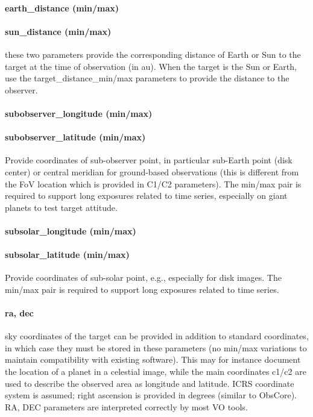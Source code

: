 \documentclass[11pt,a4paper]{ivoa}
\begin{document}
\paragraph{earth\_distance (min/max)}

\paragraph{sun\_distance (min/max)}

these two parameters provide the corresponding distance of Earth or Sun to the target at the time of observation (in au). When the target is the Sun or Earth, use the target\_distance\_min/max parameters to provide the distance to the observer.

\paragraph{subobserver\_longitude (min/max)}

\paragraph{subobserver\_latitude (min/max)}

Provide coordinates of sub-observer point, in particular sub-Earth point (disk center) or central meridian for ground-based observations (this is different from the FoV location which is provided in C1/C2 parameters). The min/max pair is required to support long exposures related to time series, especially on giant planets to test target attitude.

\paragraph{subsolar\_longitude (min/max)}

\paragraph{subsolar\_latitude (min/max)}

Provide coordinates of sub-solar point, e.g., especially for disk images. The min/max pair is required to support long exposures related to time series.

\paragraph{ra, dec}

sky coordinates of the target can be provided in addition to standard coordinates, in which case they must be stored in these parameters (no min/max variations to maintain compatibility with existing software). This may for instance document the location of a planet in a celestial image, while the main coordinates c1/c2 are used to describe the observed area as longitude and latitude. ICRS coordinate system is assumed; right ascension is provided in degrees (similar to ObsCore). RA, DEC parameters are interpreted correctly by most VO tools.
\end{document}
